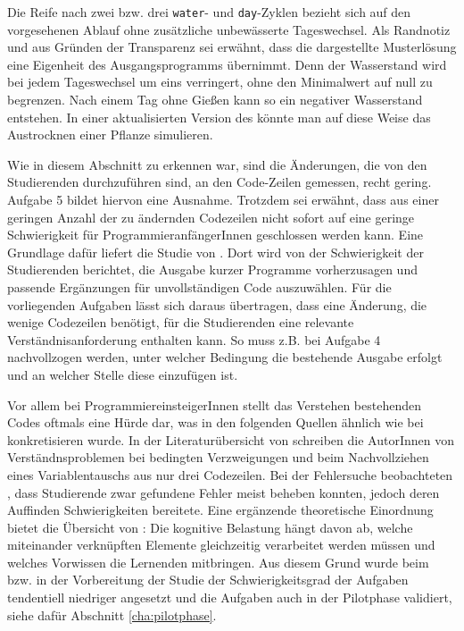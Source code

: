 Die Reife nach zwei bzw. drei \texttt{water}- und \texttt{day}-Zyklen bezieht sich auf den vorgesehenen Ablauf ohne zusätzliche unbewässerte Tageswechsel. Als Randnotiz und aus Gründen der Transparenz sei erwähnt, dass die dargestellte Musterlösung eine Eigenheit des Ausgangsprogramms übernimmt. Denn der Wasserstand wird bei jedem Tageswechsel um eins verringert, ohne den Minimalwert auf null zu begrenzen. Nach einem Tag ohne Gießen kann so ein negativer Wasserstand entstehen. In einer aktualisierten Version des \gs könnte man auf diese Weise das Austrocknen einer Pflanze simulieren.

Wie in diesem Abschnitt zu erkennen war, sind die Änderungen, die von den Studierenden durchzuführen sind, an den Code-Zeilen gemessen, recht gering. Aufgabe 5 bildet hiervon eine Ausnahme. Trotzdem sei erwähnt, dass aus einer geringen Anzahl der zu ändernden Codezeilen nicht sofort auf eine geringe Schwierigkeit für ProgrammieranfängerInnen geschlossen werden kann. Eine Grundlage dafür liefert die Studie von \textcite[S.~119--120]{lister_multi-national_2004}. Dort wird von der Schwierigkeit der Studierenden berichtet, die Ausgabe kurzer Programme vorherzusagen und passende Ergänzungen für unvollständigen Code auszuwählen. Für die vorliegenden Aufgaben lässt sich daraus übertragen, dass eine Änderung, die wenige Codezeilen benötigt, für die Studierenden eine relevante Verständnisanforderung enthalten kann. So muss z.B. bei Aufgabe 4 nachvollzogen werden, unter welcher Bedingung die bestehende Ausgabe erfolgt und an welcher Stelle diese einzufügen ist.

Vor allem bei ProgrammiereinsteigerInnen stellt das Verstehen bestehenden Codes oftmals eine Hürde dar, was in den folgenden Quellen ähnlich wie bei \textcite[S.~119-120]{lister_multi-national_2004} konkretisieren wurde. In der Literaturübersicht von \textcite[S.~1-5]{qian_students_2017} schreiben die AutorInnen von Verständnsproblemen bei bedingten Verzweigungen und beim Nachvollziehen eines Variablentauschs aus nur drei Codezeilen. Bei der Fehlersuche beobachteten \textcite[S.~105]{fitzgerald_debugging_2008}, dass Studierende zwar gefundene Fehler meist beheben konnten, jedoch deren Auffinden Schwierigkeiten bereitete. Eine ergänzende theoretische Einordnung bietet die Übersicht von \textcite[S.~40]{duran_cognitive_2022}: Die kognitive Belastung hängt davon ab, welche miteinander verknüpften Elemente gleichzeitig verarbeitet werden müssen und welches Vorwissen die Lernenden mitbringen. Aus diesem Grund wurde beim \gs bzw. in der Vorbereitung der Studie der Schwierigkeitsgrad der Aufgaben tendentiell niedriger angesetzt und die Aufgaben auch in der Pilotphase validiert, siehe dafür Abschnitt \ref{cha:pilotphase}.


